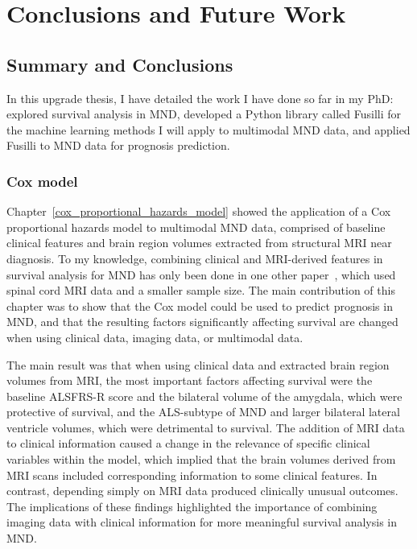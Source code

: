 \chapter{Conclusions and Future Work}
\label{conclusions_and_future_work}

\section{Summary and Conclusions}

In this upgrade thesis, I have detailed the work I have done so far in my PhD: explored survival analysis in MND, developed a Python library called Fusilli for the machine learning methods I will apply to multimodal MND data, and applied Fusilli to MND data for prognosis prediction.

\subsection{Cox model}

Chapter~\ref{cox_proportional_hazards_model} showed the application of a Cox proportional hazards model to multimodal MND data, comprised of baseline clinical features and brain region volumes extracted from structural MRI near diagnosis.
To my knowledge, combining clinical and MRI-derived features in survival analysis for MND has only been done in one other paper~\cite{querinSpinalCordMultiparametric2017}, which used spinal cord MRI data and a smaller sample size.
The main contribution of this chapter was to show that the Cox model could be used to predict prognosis in MND, and that the resulting factors significantly affecting survival are changed when using clinical data, imaging data, or multimodal data.

The main result was that when using clinical data and extracted brain region volumes from MRI, the most important factors affecting survival were the baseline ALSFRS-R score and the bilateral volume of the amygdala, which were protective of survival, and the ALS-subtype of MND and larger bilateral lateral ventricle volumes, which were detrimental to survival.
The addition of MRI data to clinical information caused a change in the relevance of specific clinical variables within the model, which implied that the brain volumes derived from MRI scans included corresponding information to some clinical features.
In contrast, depending simply on MRI data produced clinically unusual outcomes.
The implications of these findings highlighted the importance of combining imaging data with clinical information for more meaningful survival analysis in MND.


